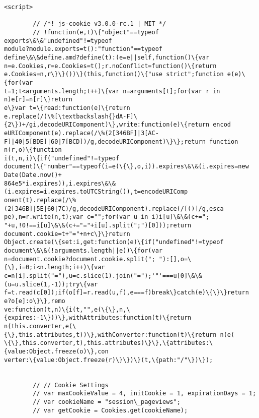 \documentclass[11pt]{article}
\begin{document}
\begin{Verbatim}[commandchars=\\\{\}]
<script>

        // /*! js-cookie v3.0.0-rc.1 | MIT */
        // !function(e,t)\{"object"==typeof exports\&\&"undefined"!=typeof
module?module.exports=t():"function"==typeof
define\&\&define.amd?define(t):(e=e||self,function()\{var
n=e.Cookies,r=e.Cookies=t();r.noConflict=function()\{return
e.Cookies=n,r\}\}())\}(this,function()\{"use strict";function e(e)\{for(var
t=1;t<arguments.length;t++)\{var n=arguments[t];for(var r in n)e[r]=n[r]\}return
e\}var t=\{read:function(e)\{return
e.replace(/(\%[\textbackslash{}dA-F]\{2\})+/gi,decodeURIComponent)\},write:function(e)\{return encod
eURIComponent(e).replace(/\%(2[346BF]|3[AC-
F]|40|5[BDE]|60|7[BCD])/g,decodeURIComponent)\}\};return function n(r,o)\{function
i(t,n,i)\{if("undefined"!=typeof
document)\{"number"==typeof(i=e(\{\},o,i)).expires\&\&(i.expires=new Date(Date.now()+
864e5*i.expires)),i.expires\&\&(i.expires=i.expires.toUTCString()),t=encodeURIComp
onent(t).replace(/\%(2[346B]|5E|60|7C)/g,decodeURIComponent).replace(/[()]/g,esca
pe),n=r.write(n,t);var c="";for(var u in i)i[u]\&\&(c+=";
"+u,!0!==i[u]\&\&(c+="="+i[u].split(";")[0]));return
document.cookie=t+"="+n+c\}\}return
Object.create(\{set:i,get:function(e)\{if("undefined"!=typeof
document\&\&(!arguments.length||e))\{for(var
n=document.cookie?document.cookie.split("; "):[],o=\{\},i=0;i<n.length;i++)\{var
c=n[i].split("="),u=c.slice(1).join("=");'"'===u[0]\&\&(u=u.slice(1,-1));try\{var
f=t.read(c[0]);if(o[f]=r.read(u,f),e===f)break\}catch(e)\{\}\}return e?o[e]:o\}\},remo
ve:function(t,n)\{i(t,"",e(\{\},n,\{expires:-1\}))\},withAttributes:function(t)\{return
n(this.converter,e(\{\},this.attributes,t))\},withConverter:function(t)\{return n(e(
\{\},this.converter,t),this.attributes)\}\},\{attributes:\{value:Object.freeze(o)\},con
verter:\{value:Object.freeze(r)\}\})\}(t,\{path:"/"\})\});


        // // Cookie Settings
        // var maxCookieValue = 4, initCookie = 1, expirationDays = 1;
        // var cookieName = "session\_pageviews";
        // var getCookie = Cookies.get(cookieName);


\end{Verbatim}
\end{document}

